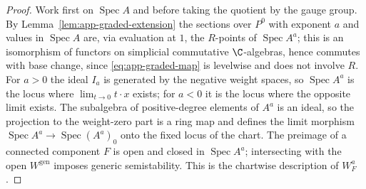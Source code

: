 \begin{proof}
Work first on \(\operatorname{Spec}A\) and before taking the quotient by the
gauge group.  By Lemma~\ref{lem:app-graded-extension} the sections over
\(P^0\) with exponent \(a\) and values in \(\operatorname{Spec}A\) are, via
evaluation at \(1\), the \(R\)-points of \(\operatorname{Spec}A^a\); this is an
isomorphism of functors on simplicial commutative \(\C\)-algebras, hence
commutes with base change, since \eqref{eq:app-graded-map} is levelwise and
does not involve \(R\).  For \(a>0\) the ideal \(I_a\) is generated by the
negative weight spaces, so \(\operatorname{Spec}A^a\) is the locus where
\(\lim_{t\to0}t\cdot x\) exists; for \(a<0\) it is the locus where the opposite
limit exists.  The subalgebra of positive-degree elements of \(A^a\) is an
ideal, so the projection to the weight-zero part is a ring map and defines the
limit morphism \(\operatorname{Spec}A^a\to\operatorname{Spec}(A^a)_0\) onto the
fixed locus of the chart.  The preimage of a connected component \(F\) is open
and closed in \(\operatorname{Spec}A^a\); intersecting with the open
\(W^{\mathrm{gen}}\) imposes generic semistability.  This is the chartwise
description of \(W_F^a\).


\end{proof}

